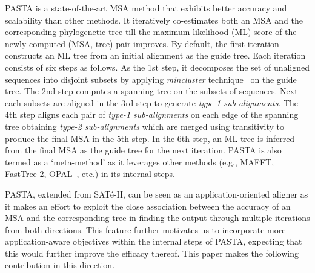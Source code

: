 \documentclass[a4paper,fleqn, review]{cas-dc}
\begin{document}
PASTA is a state-of-the-art MSA method that exhibits better accuracy and scalability than other methods. It iteratively co-estimates both an MSA and the corresponding phylogenetic tree till the maximum likelihood (ML) score of the newly computed (MSA, tree) pair improves. By default, the first iteration constructs an ML tree from an initial alignment as the guide tree. Each iteration consists of six steps as follows. As the 1st step, it decomposes the set of unaligned sequences into disjoint subsets by applying \textit{mincluster} technique~\cite{balaban2019treecluster} on the guide tree. The 2nd step computes a spanning tree on the subsets of sequences. Next each subsets are aligned in the 3rd step to generate \textit{type-1 sub-alignments}. The 4th step aligns each pair of \textit{type-1 sub-alignments} on each edge of the spanning tree obtaining \textit{type-2 sub-alignments} which are merged using transitivity to produce the final MSA in the 5th step. In the 6th step, an ML tree is inferred from the final MSA as the guide tree for the next iteration. PASTA is also termed as a `meta-method' as it leverages other methods (e.g., MAFFT, FastTree-2, OPAL~\cite{wheeler2007multiple}, etc.) in its internal steps. 

PASTA, extended from SAT\'e-II, can be seen as an application-oriented aligner 
as it makes an effort to exploit the close association between the
accuracy of an MSA and the corresponding tree in finding the output through multiple iterations from both directions. 
This feature further motivates us to incorporate more application-aware objectives within the internal steps of PASTA, expecting that this would further improve the efficacy thereof. This paper makes the following contribution in this direction. 
\end{document}
